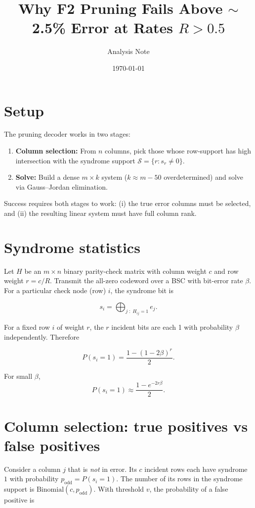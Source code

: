 \documentclass[11pt]{article}
\title{Why F2 Pruning Fails Above $\sim$2.5\% Error at Rates $R>0.5$}
\author{Analysis Note}
\date{\today}
\begin{document}
\maketitle

\section{Setup}

The pruning decoder works in two stages:
\begin{enumerate}
  \item \textbf{Column selection:} From $n$ columns, pick those whose row-support has
        high intersection with the syndrome support $\mathcal{S}=\{r : s_r\neq0\}$.
  \item \textbf{Solve:} Build a dense $m\times k$ system ($k\approx m-50$ overdetermined)
        and solve via Gauss--Jordan elimination.
\end{enumerate}

Success requires both stages to work: (i) the true error columns must be selected,
and (ii) the resulting linear system must have full column rank.

\section{Syndrome statistics}

Let $H$ be an $m\times n$ binary parity-check matrix with column weight $c$ and
row weight $r=c/R$.  Transmit the all-zero codeword over a BSC with bit-error
rate $\beta$.  For a particular check node (row) $i$, the syndrome bit is

\[
s_i = \bigoplus_{j\;:\;H_{ij}=1} e_j .
\]

For a fixed row $i$ of weight $r$, the $r$ incident bits are each 1 with
probability $\beta$ independently.  Therefore

\[
P(s_i = 1) = \frac{1 - (1-2\beta)^r}{2}.
\]

For small $\beta$,
\[
P(s_i = 1) \approx \frac{1 - e^{-2r\beta}}{2}.
\]

\section{Column selection: true positives vs false positives}

Consider a column $j$ that is \emph{not} in error.  Its $c$ incident rows each
have syndrome $1$ with probability $p_\text{odd}=P(s_i=1)$.  The number of its
rows in the syndrome support is $\mathrm{Binomial}(c, p_\text{odd})$.  With
threshold $v$, the probability of a false positive is
\end{document}
